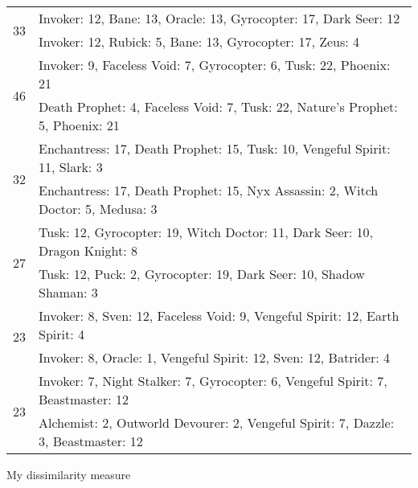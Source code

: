 \begin{table}[H]
\begin{tabular}{ | c | p{12.5cm} | }
\hline
\multirow{2}{*}{33}
& Invoker: 12, Bane: 13, Oracle: 13, Gyrocopter: 17, Dark Seer: 12 \\
& Invoker: 12, Rubick: 5, Bane: 13, Gyrocopter: 17, Zeus: 4 \\
\hline
\multirow{2}{*}{46}
& Invoker: 9, Faceless Void: 7, Gyrocopter: 6, Tusk: 22, Phoenix: 21 \\
& Death Prophet: 4, Faceless Void: 7, Tusk: 22, Nature's Prophet: 5, Phoenix: 21 \\
\hline
\multirow{2}{*}{32}
& Enchantress: 17, Death Prophet: 15, Tusk: 10, Vengeful Spirit: 11, Slark: 3 \\
& Enchantress: 17, Death Prophet: 15, Nyx Assassin: 2, Witch Doctor: 5, Medusa: 3 \\
\hline
\multirow{2}{*}{27}
& Tusk: 12, Gyrocopter: 19, Witch Doctor: 11, Dark Seer: 10, Dragon Knight: 8 \\
& Tusk: 12, Puck: 2, Gyrocopter: 19, Dark Seer: 10, Shadow Shaman: 3 \\
\hline
\multirow{2}{*}{23}
& Invoker: 8, Sven: 12, Faceless Void: 9, Vengeful Spirit: 12, Earth Spirit: 4 \\
& Invoker: 8, Oracle: 1, Vengeful Spirit: 12, Sven: 12, Batrider: 4 \\
\hline
\multirow{2}{*}{23}
& Invoker: 7, Night Stalker: 7, Gyrocopter: 6, Vengeful Spirit: 7, Beastmaster: 12 \\
& Alchemist: 2, Outworld Devourer: 2, Vengeful Spirit: 7, Dazzle: 3, Beastmaster: 12 \\
\hline
    \end{tabular}
    \caption{}
    \label{}
    \end{table}

My dissimilarity measure

